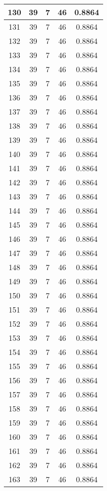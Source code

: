 \documentclass[letterpaper, 12pt]{article}
\begin{document}
\begin{longtable}{|c|c|c|c|c|}
\hline
130 & 39 & 7 & 46 & 0.8864 \\
\hline
131 & 39 & 7 & 46 & 0.8864 \\
\hline
132 & 39 & 7 & 46 & 0.8864 \\
\hline
133 & 39 & 7 & 46 & 0.8864 \\
\hline
134 & 39 & 7 & 46 & 0.8864 \\
\hline
135 & 39 & 7 & 46 & 0.8864 \\
\hline
136 & 39 & 7 & 46 & 0.8864 \\
\hline
137 & 39 & 7 & 46 & 0.8864 \\
\hline
138 & 39 & 7 & 46 & 0.8864 \\
\hline
139 & 39 & 7 & 46 & 0.8864 \\
\hline
140 & 39 & 7 & 46 & 0.8864 \\
\hline
141 & 39 & 7 & 46 & 0.8864 \\
\hline
142 & 39 & 7 & 46 & 0.8864 \\
\hline
143 & 39 & 7 & 46 & 0.8864 \\
\hline
144 & 39 & 7 & 46 & 0.8864 \\
\hline
145 & 39 & 7 & 46 & 0.8864 \\
\hline
146 & 39 & 7 & 46 & 0.8864 \\
\hline
147 & 39 & 7 & 46 & 0.8864 \\
\hline
148 & 39 & 7 & 46 & 0.8864 \\
\hline
149 & 39 & 7 & 46 & 0.8864 \\
\hline
150 & 39 & 7 & 46 & 0.8864 \\
\hline
151 & 39 & 7 & 46 & 0.8864 \\
\hline
152 & 39 & 7 & 46 & 0.8864 \\
\hline
153 & 39 & 7 & 46 & 0.8864 \\
\hline
154 & 39 & 7 & 46 & 0.8864 \\
\hline
155 & 39 & 7 & 46 & 0.8864 \\
\hline
156 & 39 & 7 & 46 & 0.8864 \\
\hline
157 & 39 & 7 & 46 & 0.8864 \\
\hline
158 & 39 & 7 & 46 & 0.8864 \\
\hline
159 & 39 & 7 & 46 & 0.8864 \\
\hline
160 & 39 & 7 & 46 & 0.8864 \\
\hline
161 & 39 & 7 & 46 & 0.8864 \\
\hline
162 & 39 & 7 & 46 & 0.8864 \\
\hline
163 & 39 & 7 & 46 & 0.8864 \\

\end{longtable}
\end{document}
